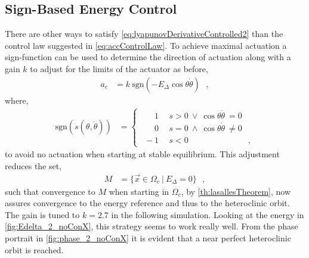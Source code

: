 \subsection{Sign-Based Energy Control}
There are other ways to satisfy \autoref{eq:lyapunovDerivativeControlled2} than the control law suggested in \autoref{eq:accControlLaw}. To achieve maximal actuation a sign-function can be used to determine the direction of actuation along with a gain $k$ to adjust for the limits of the actuator as before,
\begin{align}
  a_c &= k\ \mathrm{sgn}(-E_\Delta \cos \theta \dot{\theta})  \ \ \ ,  \label{eq:accControlLaw2} 
\end{align}
where,
\begin{align}
\text{sgn}( s(\theta,\dot{\theta}) ) &=
\begin{cases}
\ \ \phantom{-} 1  & \ \ s  > 0 \ \lor   \ \cos \theta \dot{\theta} \ =    0 \\
\ \ \phantom{-} 0  & \ \ s  = 0 \ \land  \ \cos \theta \dot{\theta} \ \neq 0 \\
\ \            -1  & \ \ s  < 0 \hspace{3cm} ,
\end{cases}
\label{eq:sgnFunction}
\end{align}
to avoid no actuation when starting at stable equilibrium. This adjustment reduces the set,
\begin{align}
  M  &= \{ \vec{x} \in \Omega_c \ | \ E_\Delta = 0 \}  \ \ \ ,  \label{eq:M2}
\end{align}
such that convergence to $M$ when starting in $\Omega_c$, by \autoref{th:lasallesTheorem}, now assures convergence to the energy reference and thus to the heteroclinic orbit.\\
The gain is tuned to $k = 2.7$ in the following simulation. Looking at the energy in \autoref{fig:Edelta_2_noConX}, this strategy seems to work really well. From the phase portrait in \autoref{fig:phase_2_noConX} it is evident that a near perfect heteroclinic orbit is reached.

